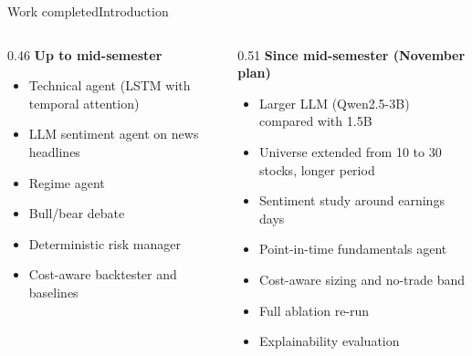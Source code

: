 \documentclass[aspectratio=169,11pt]{beamer}
\newcommand{\lead}[1]{{\small\bfseries\color{accent}#1}\par\vspace{0.35em}}
\begin{document}
\begin{frame}{Work completed\hfill{\normalfont\footnotesize\color{muted}Introduction}}
\begin{columns}[t]\begin{column}{0.46\textwidth}
\lead{Up to mid-semester}
\begin{itemize}\setlength{\itemsep}{0.4em}\small
\item Technical agent (LSTM with temporal attention)
\item LLM sentiment agent on news headlines
\item Regime agent
\item Bull/bear debate
\item Deterministic risk manager
\item Cost-aware backtester and baselines
\end{itemize}\end{column}\begin{column}{0.51\textwidth}
\lead{Since mid-semester (November plan)}
\begin{itemize}\setlength{\itemsep}{0.4em}\small
\item Larger LLM (Qwen2.5-3B) compared with 1.5B
\item Universe extended from 10 to 30 stocks, longer period
\item Sentiment study around earnings days
\item Point-in-time fundamentals agent
\item Cost-aware sizing and no-trade band
\item Full ablation re-run
\item Explainability evaluation
\end{itemize}\end{column}\end{columns}
\end{frame}
\end{document}
